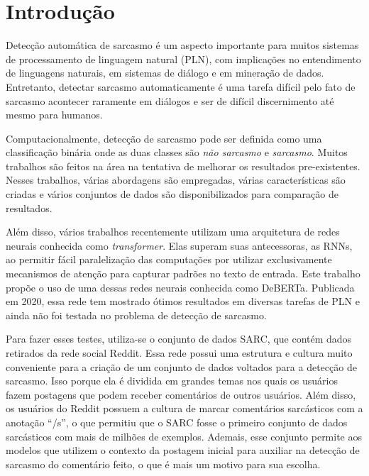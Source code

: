 

\chapter{Introdução}%
\label{cha:introducao}

Detecção automática de sarcasmo é um aspecto importante para muitos sistemas de
processamento de linguagem natural (PLN), com implicações no entendimento de
linguagens naturais, em sistemas de diálogo e em mineração de dados. Entretanto,
detectar sarcasmo automaticamente é uma tarefa difícil pelo fato de sarcasmo
acontecer raramente em diálogos e ser de difícil discernimento até mesmo para
humanos.

Computacionalmente, detecção de sarcasmo pode ser definida como uma
classificação binária onde as duas classes são \textit{não sarcasmo} e
\textit{sarcasmo}. Muitos trabalhos são feitos na área na tentativa de melhorar
os resultados pre-existentes. Nesses trabalhos, várias abordagens são
empregadas, várias características são criadas e vários conjuntos de dados são
disponibilizados para comparação de resultados.

Além disso, vários trabalhos recentemente utilizam uma arquitetura de redes
neurais conhecida como \textit{transformer}. Elas superam suas antecessoras, as
RNNs, ao permitir fácil paralelização das computações por utilizar
exclusivamente mecanismos de atenção para capturar padrões no texto de entrada.
Este trabalho propõe o uso de uma dessas redes neurais conhecida como DeBERTa.
Publicada em 2020, essa rede tem mostrado ótimos resultados em diversas tarefas
de PLN e ainda não foi testada no problema de detecção de sarcasmo.

Para fazer esses testes, utiliza-se o conjunto de dados SARC, que contém dados
retirados da rede social Reddit. Essa rede possui uma estrutura e cultura muito
conveniente para a criação de um conjunto de dados voltados para a detecção de
sarcasmo. Isso porque ela é dividida em grandes temas nos quais os usuários
fazem postagens que podem receber comentários de outros usuários. Além disso, os
usuários do Reddit possuem a cultura de marcar comentários sarcásticos com a
anotação ``/s'', o que permitiu que o SARC fosse o primeiro conjunto de dados
sarcásticos com mais de milhões de exemplos. Ademais, esse conjunto permite aos
modelos que utilizem o contexto da postagem inicial para auxiliar na detecção de
sarcasmo do comentário feito, o que é mais um motivo para sua escolha.

